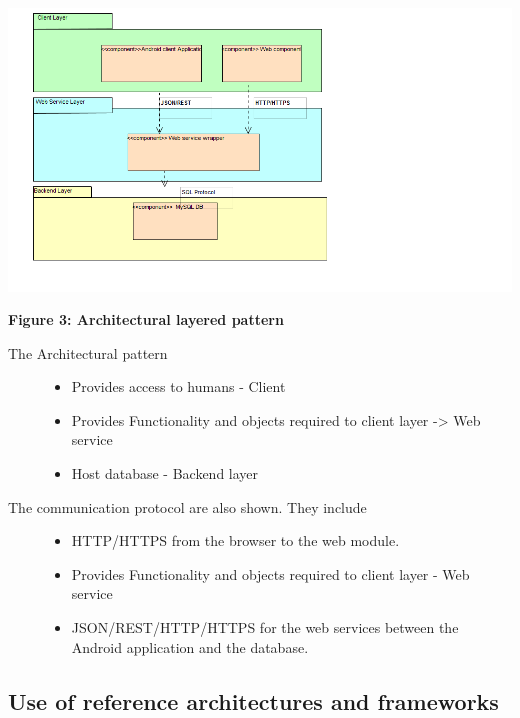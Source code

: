 \documentclass[10pt,a4paper]{article}
\begin{document}
\begin{center}
\includegraphics[scale=0.4]{Architectural-Pattern.png}

\textbf{Figure 3: Architectural layered pattern}
\end{center}

\begin{description}
\item [The Architectural pattern]

\begin{itemize}
\item Provides access to humans  - Client
\item Provides Functionality  and objects required to client layer -> Web service
\item Host database - Backend layer
\end{itemize}

\item [The communication protocol are also shown. They include]

\begin{itemize}
\item HTTP/HTTPS from the browser to the web module.
\item Provides Functionality  and objects required to client layer - Web service
\item JSON/REST/HTTP/HTTPS for the web services between the Android application and the database.
\end{itemize}

\end{description}

\subsection{Use of reference architectures and frameworks}
\end{document}
